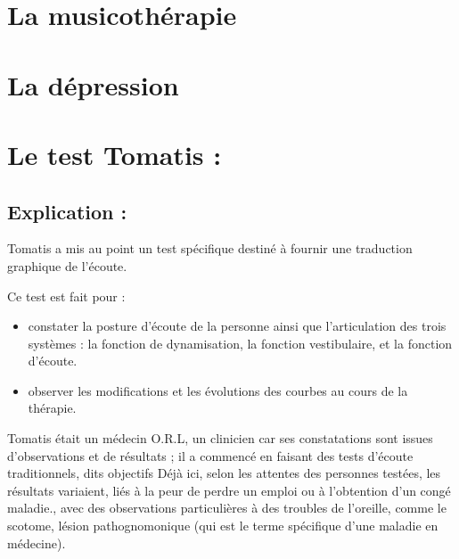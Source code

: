 \documentclass[12pt,french]{report}
\makeatletter
\let\SF@@footnote\footnote
\def\footnote{\ifx\protect\@typeset@protect
    \expandafter\SF@@footnote
  \else
    \expandafter\SF@gobble@opt
  \fi
}
\edef\SF@gobble@opt{\noexpand\protect
  \expandafter\noexpand\csname SF@gobble@opt \endcsname}
\makeatother
\begin{document}
\chapter{La musicothérapie}

\chapter{La dépression}

\chapter{Le test Tomatis : }

\section{Explication :}

Tomatis a mis au point un test spécifique destiné à fournir une traduction
graphique de l'écoute.

Ce test est fait pour :
\begin{itemize}
\item constater la posture d'écoute de la personne ainsi que l'articulation
des trois systèmes : la fonction de dynamisation, la fonction vestibulaire,
et la fonction d'écoute.
\item observer les modifications et les évolutions des courbes au cours
de la thérapie.
\end{itemize}
Tomatis était un médecin O.R.L, un clinicien car ses constatations
sont issues d'observations et de résultats ; il a commencé en faisant
des tests d'écoute traditionnels, dits objectifs\footnote{Déjà ici, selon les attentes des personnes testées, les résultats
variaient, liés à la peur de perdre un emploi ou à l'obtention d'un
congé maladie.}, avec des observations particulières à des troubles de l'oreille,
comme le scotome, lésion pathognomonique (qui est le terme spécifique
d'une maladie en médecine). 
\end{document}
